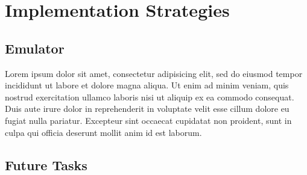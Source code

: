 \documentclass[11pt]{article}
\begin{document}
\section{Implementation Strategies}

\subsection{Emulator}

Lorem ipsum dolor sit amet, consectetur adipisicing elit, sed do eiusmod tempor
incididunt ut labore et dolore magna aliqua. Ut enim ad minim veniam, quis
nostrud exercitation ullamco laboris nisi ut aliquip ex ea commodo consequat.
Duis aute irure dolor in reprehenderit in voluptate velit esse cillum dolore eu
fugiat nulla pariatur. Excepteur sint occaecat cupidatat non proident, sunt in
culpa qui officia deserunt mollit anim id est laborum.

\subsection{Future Tasks}
\end{document}
